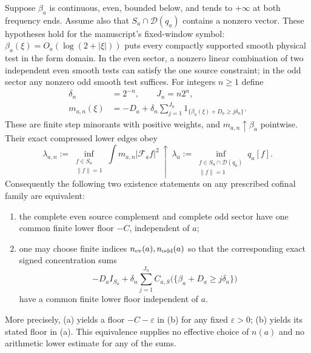 \begin{proposition}
\label{ns43-conc-prop-adaptive}
Suppose $\beta_a$ is continuous, even, bounded below, and tends to
$+\infty$ at both frequency ends. Assume also that
$S_a\cap\mathcal D(q_a)$ contains a nonzero vector.
These hypotheses hold for the manuscript's fixed-window symbol:
$\beta_a(\xi)=O_a(\log(2+|\xi|))$ puts every compactly supported
smooth physical test in the form domain. In the even sector, a
nonzero linear combination of two independent even smooth tests
can satisfy the one source constraint; in the odd sector any
nonzero odd smooth test suffices. For integers $n\ge1$ define
\begin{align*}
 \delta_n&=2^{-n},\qquad J_n=n2^n,\\
 m_{a,n}(\xi)&=-D_a+
 \delta_n\sum_{j=1}^{J_n}
       1_{\{\beta_a(\xi)+D_a\ge j\delta_n\}}.
\end{align*}
These are finite step minorants with positive weights, and
$m_{a,n}\uparrow\beta_a$ pointwise. Their exact compressed lower
edges obey
\begin{equation}\label{ns43-conc-eq-edge-limit}
 \lambda_{a,n}:=\inf_{\substack{f\in S_a\\\|f\|=1}}
   \int m_{a,n}|\mathcal F_af|^2
 \ \uparrow\
 \lambda_a:=\inf_{\substack{f\in S_a\cap\mathcal D(q_a)\\\|f\|=1}}
   q_a[f].
\end{equation}
Consequently the following two existence statements on any prescribed
cofinal family are equivalent:
\begin{enumerate}[label=(\alph*)]
\item the complete even source complement and complete odd sector
have one common finite lower floor $-C$, independent of $a$;
\item one may choose finite indices $n_{\rm ev}(a),n_{\rm odd}(a)$
so that the corresponding exact signed concentration sums
\[
 -D_a I_{S_a}+\delta_n\sum_{j=1}^{J_n}
 C_{a,S}\bigl(\{\beta_a+D_a\ge j\delta_n\}\bigr)
\]
have a common finite lower floor independent of $a$.
\end{enumerate}
More precisely, (a) yields a floor $-C-\varepsilon$ in (b) for any
fixed $\varepsilon>0$; (b) yields its stated floor in (a).
This equivalence supplies no effective choice of $n(a)$ and no
arithmetic lower estimate for any of the sums.
\end{proposition}
